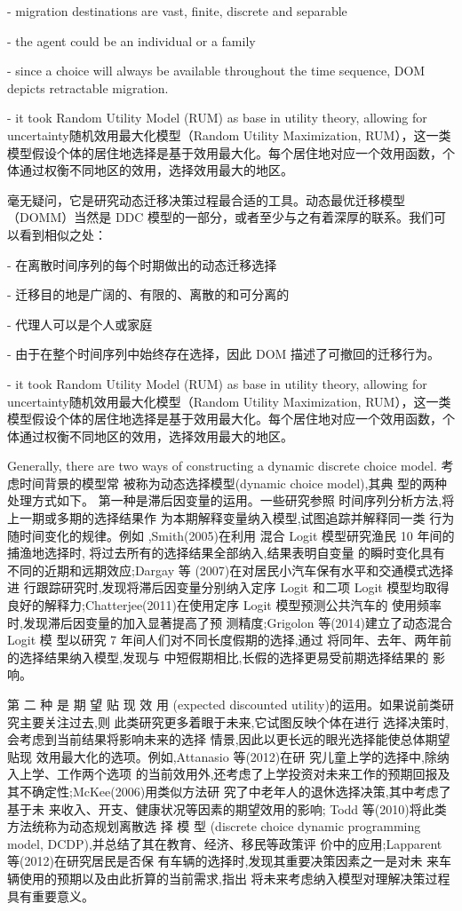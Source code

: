 \documentclass[a4paper,12pt,oneside]{book} %
\begin{document}
- migration destinations are vast, finite, discrete and separable

- the agent could be an individual or a family

- since a choice will always be available throughout the time sequence, DOM depicts retractable migration.

- it took Random Utility Model (RUM) as base in utility theory, allowing for uncertainty随机效用最大化模型（Random Utility Maximization, RUM），这一类模型假设个体的居住地选择是基于效用最大化。每个居住地对应一个效用函数，个体通过权衡不同地区的效用，选择效用最大的地区。

毫无疑问，它是研究动态迁移决策过程最合适的工具。动态最优迁移模型（DOMM）当然是 DDC 模型的一部分，或者至少与之有着深厚的联系。我们可以看到相似之处：

- 在离散时间序列的每个时期做出的动态迁移选择

- 迁移目的地是广阔的、有限的、离散的和可分离的

- 代理人可以是个人或家庭

- 由于在整个时间序列中始终存在选择，因此 DOM 描述了可撤回的迁移行为。

- it took Random Utility Model (RUM) as base in utility theory, allowing for uncertainty随机效用最大化模型（Random Utility Maximization, RUM），这一类模型假设个体的居住地选择是基于效用最大化。每个居住地对应一个效用函数，个体通过权衡不同地区的效用，选择效用最大的地区。



Generally, there are two ways of constructing a dynamic discrete choice model.
\cite{}
考虑时间背景的模型常 被称为动态选择模型(dynamic choice model),其典 型的两种处理方式如下。 第一种是滞后因变量的运用。一些研究参照 时间序列分析方法,将上一期或多期的选择结果作 为本期解释变量纳入模型,试图追踪并解释同一类 行为随时间变化的规律。例如
,Smith(2005)在利用 混合 Logit 模型研究渔民 10 年间的捕渔地选择时, 将过去所有的选择结果全部纳入,结果表明自变量 的瞬时变化具有不同的近期和远期效应;Dargay 等 (2007)在对居民小汽车保有水平和交通模式选择进 行跟踪研究时,发现将滞后因变量分别纳入定序 Logit 和二项 Logit 模型均取得良好的解释力;Chatterjee(2011)在使用定序 Logit 模型预测公共汽车的 使用频率时,发现滞后因变量的加入显著提高了预 测精度;Grigolon 等(2014)建立了动态混合 Logit 模 型以研究 7 年间人们对不同长度假期的选择,通过 将同年、去年、两年前的选择结果纳入模型,发现与 中短假期相比,长假的选择更易受前期选择结果的 影响。

第 二 种 是 期 望 贴 现 效 用 (expected discounted utility)的运用。如果说前类研究主要关注过去,则 此类研究更多着眼于未来,它试图反映个体在进行 选择决策时,会考虑到当前结果将影响未来的选择 情景,因此以更长远的眼光选择能使总体期望贴现 效用最大化的选项。例如,Attanasio 等(2012)在研 究儿童上学的选择中,除纳入上学、工作两个选项 的当前效用外,还考虑了上学投资对未来工作的预期回报及其不确定性;McKee(2006)用类似方法研 究了中老年人的退休选择决策,其中考虑了基于未 来收入、开支、健康状况等因素的期望效用的影响; Todd 等(2010)将此类方法统称为动态规划离散选 择 模 型 (discrete choice dynamic programming model, DCDP),并总结了其在教育、经济、移民等政策评 价中的应用;Lapparent 等(2012)在研究居民是否保 有车辆的选择时,发现其重要决策因素之一是对未 来车辆使用的预期以及由此折算的当前需求,指出 将未来考虑纳入模型对理解决策过程具有重要意义。
\end{document}
